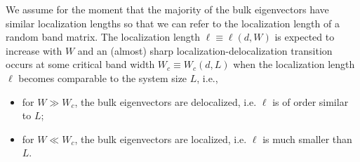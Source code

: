 \documentclass{article}
\newcommand{\1}{\mathds{1}}
\numberwithin{equation}{section}
\theoremstyle{plain} %
\theoremstyle{remark}
\begin{document}
We assume for the moment that the majority of the bulk eigenvectors have similar localization lengths so that we can refer to the localization length of a random band matrix. The localization length $\ell\equiv \ell(d,W)$ is expected to increase with $W$ and an (almost) sharp localization-delocalization transition occurs at some critical band width $W_c\equiv W_c(d,L)$ when the localization length  $\ell$ becomes comparable to  the system size $L$, i.e., 
\begin{itemize}%
	\item for  $W \gg W_c$, the bulk eigenvectors are delocalized, i.e. $\ell$ is of order similar to  $L$; %
	\item for  $W \ll W_c$, the bulk eigenvectors are localized, i.e. $\ell$ is much smaller than $L$.
\end{itemize}
\end{document}
